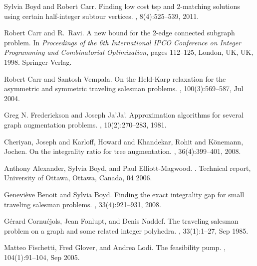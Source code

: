 \documentclass[runningheads]{llncs}
\begin{document}
%
%
%
% 
% 
%
\begin{thebibliography}{10}
	
	
	Sylvia Boyd and Robert Carr.
	\newblock Finding low cost tsp and 2-matching solutions using certain
	half-integer subtour vertices.
	, 8(4):525--539, 2011.
	
	Robert Carr and R.~Ravi.
	\newblock A new bound for the 2-edge connected subgraph problem.
	\newblock In {\em Proceedings of the 6th International IPCO Conference on
		Integer Programming and Combinatorial Optimization}, pages 112--125, London,
	UK, UK, 1998. Springer-Verlag.
	
	Robert Carr and Santosh Vempala.
	\newblock On the {H}eld-{K}arp relaxation for the asymmetric and symmetric
	traveling salesman problems.
	, 100(3):569--587, Jul 2004.
	
	Greg N. Frederickson and Joseph Ja'Ja'.
	\newblock Approximation algorithms for several graph
	augmentation problems.
	, 10(2):270--283, 1981.
	
	Cheriyan, Joseph and Karloff, Howard and Khandekar, Rohit and K{\"o}nemann, Jochen.
	\newblock On the integrality ratio for tree augmentation.
	, 36(4):399--401, 2008.
    	
    Anthony Alexander, Sylvia Boyd, and Paul Elliott-Magwood.
    .
    \newblock Technical report, University of Ottawa, Ottawa, Canada, 04 2006.
    
    Geneviève Benoit and Sylvia Boyd.
    \newblock Finding the exact integrality gap for small traveling salesman
      problems.
    , 33(4):921--931, 2008.

	G{\'e}rard Cornu{\'e}jols, Jean Fonlupt, and Denis Naddef.
	\newblock The traveling salesman problem on a graph and some related integer
	polyhedra.
	, 33(1):1--27, Sep 1985.
	
	Matteo Fischetti, Fred Glover, and Andrea Lodi.
	\newblock The feasibility pump.
	, 104(1):91--104, Sep 2005.
	

\end{thebibliography}
\end{document}
